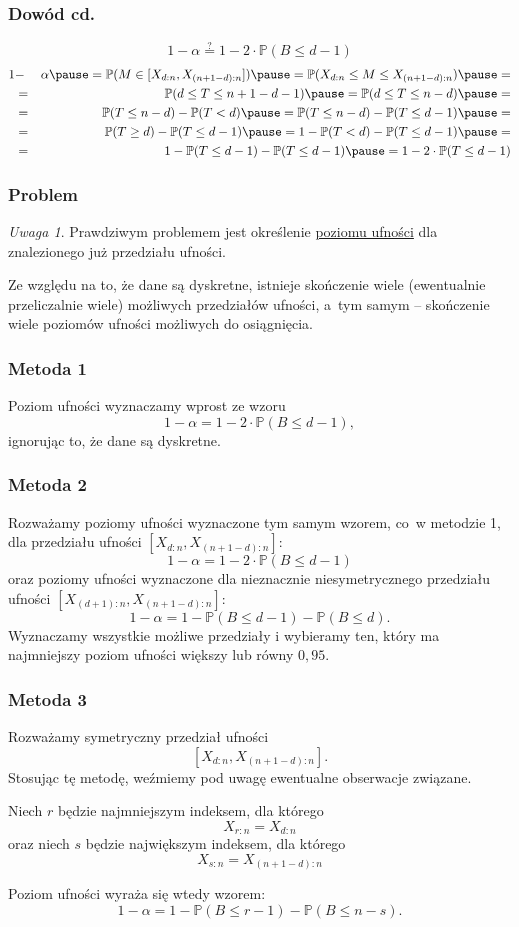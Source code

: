 \documentclass[11pt,usenames,dvipsnames,svgnames,x11names]{beamer}
\theoremstyle{plain}
\theoremstyle{definition}
\theoremstyle{remark}
\newtheorem{uwaga}{Uwaga}
\begin{document}
\begin{frame}
\frametitle{Dowód cd.}
$$
1-\alpha \stackrel{?}{=} 1-2\cdot\mathbb{P}(B \leq d-1)
$$
\begin{eqnarray*}
1&-&\alpha \pause = \mathbb{P}(M\in [X_{d:n},X_{(n+1-d):n}])\pause =\mathbb{P}(X_{d:n}\leq M \leq X_{(n+1-d):n})\pause =\\&=& \mathbb{P}(d\leq T \leq n+1-d-1)\pause =\mathbb{P}(d\leq T \leq n-d)\pause =\\&=&\mathbb{P}(T \leq n-d)-\mathbb{P}(T < d)\pause =\mathbb{P}(T \leq n-d)-\mathbb{P}(T \leq d-1)\pause =\\&=&\mathbb{P}(T \geq d)-\mathbb{P}(T \leq d-1)\pause =1-\mathbb{P}(T<d)-\mathbb{P}(T\leq d-1)\pause =\\&=& 1-\mathbb{P}(T\leq d-1)-\mathbb{P}(T\leq d-1)\pause =1-2\cdot \mathbb{P}(T\leq d-1)
\end{eqnarray*}
\end{frame}

\begin{frame}
\frametitle{Problem}
\begin{uwaga}
Prawdziwym problemem jest określenie \underline{poziomu ufności} dla znalezionego już przedziału ufności.
\end{uwaga}
Ze względu na to, że dane są dyskretne, istnieje skończenie wiele (ewentualnie przeliczalnie wiele) możliwych przedziałów ufności, a~tym samym -- skończenie wiele poziomów ufności możliwych do osiągnięcia. 
\end{frame} 

\begin{frame}
\frametitle{Metoda 1}
Poziom ufności wyznaczamy wprost ze wzoru
$$
1-\alpha = 1-2\cdot\mathbb{P}(B \leq d-1),
$$
ignorując to, że dane są dyskretne. 
\end{frame}

\begin{frame}
\frametitle{Metoda 2}
Rozważamy poziomy ufności wyznaczone tym samym wzorem, co~w metodzie 1, dla przedziału ufności $[X_{d:n},X_{(n+1-d):n}]$:
$$
1-\alpha = 1-2\cdot\mathbb{P}(B \leq d-1)
$$
oraz poziomy ufności wyznaczone dla nieznacznie niesymetrycznego przedziału ufności $[X_{(d+1):n},X_{(n+1-d):n}]$:
$$
1-\alpha = 1-\mathbb{P}(B \leq d-1)-\mathbb{P}(B \leq d).
$$
Wyznaczamy wszystkie możliwe przedziały i wybieramy ten, który ma najmniejszy poziom ufności większy lub równy $0,95$. 
\end{frame}

\begin{frame}
\frametitle{Metoda 3}
Rozważamy symetryczny przedział ufności $$[X_{d:n},X_{(n+1-d):n}].$$ Stosując tę metodę, weźmiemy pod uwagę ewentualne obserwacje związane.

Niech $r$ będzie najmniejszym indeksem, dla którego $$X_{r:n}=X_{d:n}$$ oraz niech $s$ będzie największym indeksem, dla którego $$X_{s:n}=X_{(n+1-d):n}$$ 

Poziom ufności wyraża się wtedy wzorem:
$$
1-\alpha = 1-\mathbb{P}(B \leq r-1)-\mathbb{P}(B \leq n-s).
$$
\end{frame}
\end{document}
